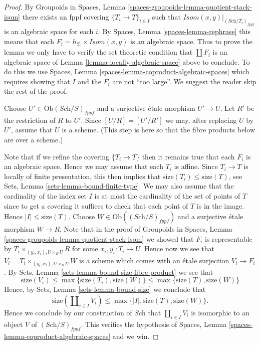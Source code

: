 \begin{proof}
By
Groupoids in Spaces,
Lemma \ref{spaces-groupoids-lemma-quotient-stack-isom}
there exists an fppf covering $\{T_i \to T\}_{i \in I}$
such that $\mathit{Isom}(x, y)|_{(\textit{Sch}/T_i)_{fppf}}$
is an algebraic space for each $i$. By
Spaces, Lemma \ref{spaces-lemma-rephrase}
this means that each $F_i = h_{S_i} \times \mathit{Isom}(x, y)$
is an algebraic space.
Thus to prove the lemma we only have to verify the set theoretic condition
that $\coprod F_i$ is an algebraic space of
Lemma \ref{lemma-locally-algebraic-space}
above to conclude. To do this we use
Spaces, Lemma \ref{spaces-lemma-coproduct-algebraic-spaces}
which requires showing that $I$ and the $F_i$ are not ``too large''.
We suggest the reader skip the rest of the proof.

\medskip\noindent
Choose $U' \in \text{Ob}(\textit{Sch}/S)_{fppf}$ and a surjective
\'etale morphism $U' \to U$. Let $R'$ be the restriction of $R$ to $U'$.
Since $[U/R] = [U'/R']$ we may, after replacing $U$ by $U'$,
assume that $U$ is a scheme. (This step is here so that the
fibre products below are over a scheme.)

\medskip\noindent
Note that if we refine the covering $\{T_i \to T\}$ then it remains
true that each $F_i$ is an algebraic space.
Hence we may assume that each $T_i$ is affine. Since
$T_i \to T$ is locally of finite presentation, this then implies that
$\text{size}(T_i) \leq \text{size}(T)$, see
Sets, Lemma \ref{sets-lemma-bound-finite-type}.
We may also assume that the cardinality of the index set $I$ is at most the
cardinality of the set of points of $T$ since to get a
covering it suffices to check that each point of $T$ is in the image.
Hence $|I| \leq \text{size}(T)$.
Choose $W \in \text{Ob}((\textit{Sch}/S)_{fppf})$
and a surjective \'etale morphism $W \to R$. Note that in the proof of
Groupoids in Spaces,
Lemma \ref{spaces-groupoids-lemma-quotient-stack-isom}
we showed that $F_i$ is representable by
$T_i \times_{(y_i, x_i), U \times_B U} R$ for some
$x_i, y_i : T_i \to U$. Hence now we see that
$V_i = T_i \times_{(y_i, x_i), U \times_B U} W$ is a
scheme which comes with an \'etale surjection $V_i \to F_i$.
By
Sets, Lemma \ref{sets-lemma-bound-size-fibre-product}
we see that
$$
\text{size}(V_i) \leq \max\{\text{size}(T_i), \text{size}(W)\}
\leq \max\{\text{size}(T), \text{size}(W)\}
$$
Hence, by
Sets, Lemma \ref{sets-lemma-bound-size}
we conclude that
$$
\text{size}(\coprod\nolimits_{i \in I} V_i)
\leq \max\{|I|, \text{size}(T), \text{size}(W)\}.
$$
Hence we conclude by our construction of $\textit{Sch}$
that $\coprod_{i \in I} V_i$ is isomorphic to an object
$V$ of $(\textit{Sch}/S)_{fppf}$. This verifies the
hypothesis of
Spaces, Lemma \ref{spaces-lemma-coproduct-algebraic-spaces}
and we win.
\end{proof}

